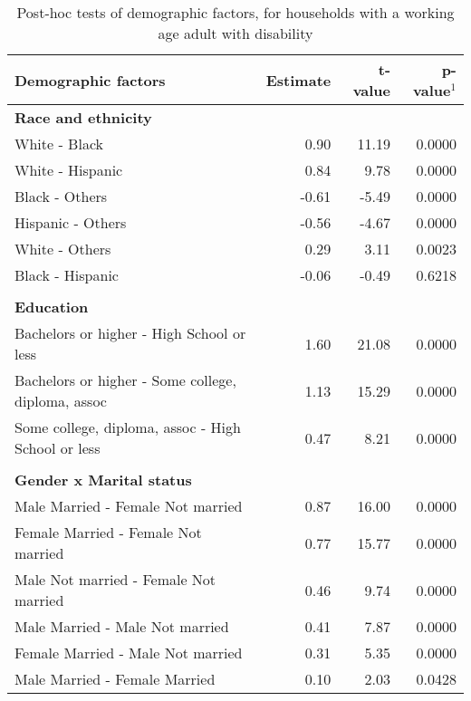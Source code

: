\singlespacing
\begin{center}
\footnotesize           %
\begin{longtable}{lrrr}

  \caption[Post-hoc tests]{Post-hoc tests of demographic factors, for households with a working age adult with disability} \\
  \hline
  {\bf{Demographic factors}} & {\bf{Estimate}} & {\bf{t-value}} & {\bf{p-value$^1$}} \\ 
  \hline
  \endhead

  \hline
  \endfoot
{\bf{Race and ethnicity}} & & & \\
   White - Black & 0.90 & 11.19 & 0.0000 \\ 
   White - Hispanic & 0.84 & 9.78 & 0.0000 \\ 
   Black - Others & -0.61 & -5.49 & 0.0000 \\ 
   Hispanic - Others & -0.56 & -4.67 & 0.0000 \\ 
   White - Others & 0.29 & 3.11 & 0.0023 \\ 
   Black - Hispanic & -0.06 & -0.49 & 0.6218 \\ 

{\bf{  }} & & & \\
{\bf{Education}} & & & \\
\hline
   Bachelors or higher - High School or less & 1.60 & 21.08 & 0.0000 \\ 
   Bachelors or higher - Some college, diploma, assoc & 1.13 & 15.29 & 0.0000 \\ 
   Some college, diploma, assoc - High School or less & 0.47 & 8.21 & 0.0000 \\ 

{\bf{  }} & & & \\
{\bf{Gender x Marital status}} & & & \\
\hline
    Male Married -  Female Not married & 0.87 & 16.00 & 0.0000 \\ 
    Female Married -  Female Not married & 0.77 & 15.77 & 0.0000 \\ 
    Male Not married -  Female Not married & 0.46 & 9.74 & 0.0000 \\ 
    Male Married -  Male Not married & 0.41 & 7.87 & 0.0000 \\ 
    Female Married -  Male Not married & 0.31 & 5.35 & 0.0000 \\ 
    Male Married -  Female Married & 0.10 & 2.03 & 0.0428 \\ 


\end{longtable}
\end{center}
